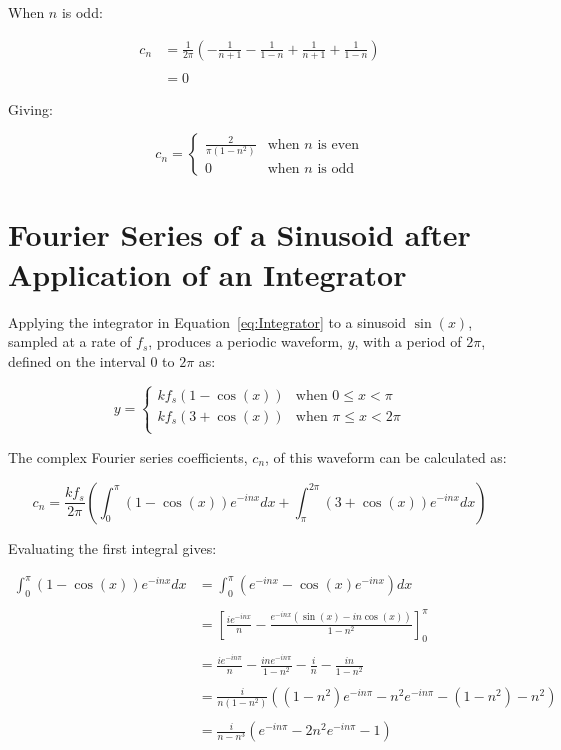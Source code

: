 \begin{appendices}
		When $n$ is odd:

		\begin{align}
			c_{n} & = \frac{1}{2\pi} \left( -\frac{1}{n+1} - 
				\frac{1}{1-n} + \frac{1}{n+1} + \frac{1}{1-n} \right) \nonumber \\
			\nonumber \\
			& = 0 \nonumber
		\end{align}

		Giving:

		\[ c_{n} = \begin{cases}
				\frac{2}{\pi(1 - n^{2})} & \text{when $n$ is even} \\
				0 & \text{when $n$ is odd}
			\end{cases} \]

	\section{Fourier Series of a Sinusoid after Application of an Integrator}
	\label{app:MathematicalDerivations-Integrator}
		Applying the integrator in Equation~\ref{eq:Integrator} to a sinusoid $\sin(x)$, sampled at a rate of
		$f_{s}$, produces a periodic waveform, $y$, with a period of $2\pi$, defined on the interval $0$ to $2\pi$
		as:

		\[ y = \begin{cases}
				kf_{s} (1 - \cos(x)) & \text{when $0 \leq x < \pi$} \\
				kf_{s} (3 + \cos(x)) & \text{when $\pi \leq x < 2\pi$} \\
			\end{cases} \]

		The complex Fourier series coefficients, $c_{n}$, of this waveform can be calculated as:

		\[ c_{n} = \frac{kf_{s}}{2\pi} \left( \int_{0}^{\pi} (1-\cos(x))e^{-inx} dx
						      + \int_{\pi}^{2\pi} (3 + \cos(x))e^{-inx} dx \right) \]

		Evaluating the first integral gives:
		
		\begin{align}
			\int_{0}^{\pi} (1-\cos(x))e^{-inx} dx & = 
				\int_{0}^{\pi} \left( e^{-inx} - \cos(x)e^{-inx} \right) dx \nonumber \\
			\nonumber \\
			& = \left[ \frac{ie^{-inx}}{n} - \frac{e^{-inx}(\sin(x) 
				- in\cos(x))}{1 - n^{2}} \right]_{0}^{\pi} \nonumber \\
			\nonumber \\
			& = \frac{ie^{-in\pi}}{n} - \frac{ine^{-in\pi}}{1 - n^{2}} 
				- \frac{i}{n} - \frac{in}{1 - n^{2}} \nonumber \\
			\nonumber \\
			& = \frac{i}{n(1-n^{2})} \left( (1 - n^{2})e^{-in\pi} - 
				n^{2}e^{-in\pi} - (1 - n^{2}) - n^2 \right) \nonumber \\
			\nonumber \\
			& = \frac{i}{n - n^{3}} \left( e^{-in\pi} - 2n^{2}e^{-in\pi} - 1 \right) \nonumber
		\end{align}


\end{appendices}
